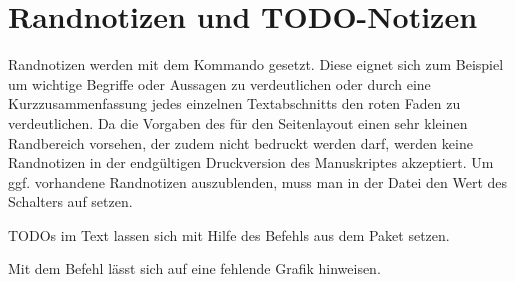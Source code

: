 \section{Randnotizen und TODO-Notizen}%
%
%
\label{sec:Randnotizen}
%
Randnotizen 
%
werden mit dem Kommando  gesetzt.
Diese eignet sich zum Beispiel um wichtige Begriffe oder Aussagen zu verdeutlichen
oder durch eine Kurzzusammenfassung jedes einzelnen Textabschnitts
den roten Faden zu verdeutlichen.
Da die Vorgaben des  für den Seitenlayout einen sehr kleinen Randbereich vorsehen, der zudem nicht bedruckt werden darf,
werden keine Randnotizen in der endgültigen Druckversion des Manuskriptes akzeptiert.
Um ggf. vorhandene Randnotizen auszublenden,
muss man in der Datei  den Wert des Schalters
 auf  setzen.

TODOs im Text lassen sich mit Hilfe des Befehls  aus dem Paket  setzen.

Mit dem Befehl  lässt sich auf eine fehlende Grafik hinweisen.
